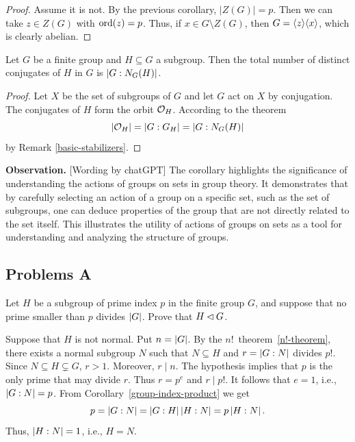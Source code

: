 \begin{proof} Assume it is not. By the previous corollary, $|Z(G)|=p$. Then we can take $z\in Z(G)$ with ${\rm ord}(z)=p$. Thus, if $x\in G\setminus Z(G)$, then $G=\langle z\rangle\langle x\rangle$, which is clearly abelian.  \end{proof}
 
\begin{cor}\label{conjugate-count}
    Let\/ $G$ be a finite group and\/ $H \subseteq G$ a subgroup. Then the total number of distinct conjugates of\/ $H$ in\/ $G$ is\/ $\left\vert{G : N_G(H)}\right\vert$.
\end{cor}

\begin{proof} Let $X$ be the set of subgroups of\/ $G$ and let $G$ act on $X$ by conjugation. The conjugates of\/ $H$ form the orbit\/ ${\cal O}_H$. According to the theorem
$$
    \left\vert{{\cal O}_H}\right\vert=|G:G_H|=|G:N_G(H)|
$$
by Remark \ref{basic-stabilizers}.  \end{proof}

\textbf{Observation.} {[\upshape Wording by chatGPT]} The corollary highlights the significance of understanding the actions of groups on sets in group theory. It demonstrates that by carefully selecting an action of a group on a specific set, such as the set of subgroups, one can deduce properties of the group that are not directly related to the set itself. This illustrates the utility of actions of groups on sets as a tool for understanding and analyzing the structure of groups.

\subsection{Problems A}

\begin{probl}\label{problem-1.A.1}
    Let $H$ be a subgroup of prime index $p$ in the finite group $G$, and suppose that no prime smaller than\/ $p$ divides $\left\vert{G}\right\vert$. Prove that $H\lhd G$.
\end{probl}

\begin{solution} Suppose that $H$ is not normal. Put $n=\left\vert{G}\right\vert$. By the $n!$~theorem~\ref{n!-theorem}, there exists a normal subgroup $N$ such that $N\subseteq H$ and $r=\left\vert{G:N}\right\vert$ divides $p!$. Since $N\subseteq H\varsubsetneq G$, $r>1$. Moreover, $r\mid n$. The hypothesis implies that $p$ is the only prime that may divide $r$. Thus $r=p^e$ and $r\mid p!$. It follows that $e=1$, i.e., $\left\vert{G: N}\right\vert=p$. From Corollary~\ref{group-index-product} we get
$$
    p=\left\vert{G:N}\right\vert=\left\vert{G:H}\right\vert\left\vert{H:N}\right\vert= p\left\vert{H:N}\right\vert.
$$
Thus, $\left\vert{H:N}\right\vert=1$, i.e., $H=N$.  \end{solution}

